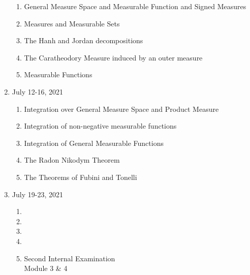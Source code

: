 \begin{enumerate}[label=Week \arabic*]
\begin{enumerate}[label=Day \arabic*]
		\item 
			General Measure Space and Measurable Function and Signed Measures
		\item 
			Measures and Measurable Sets
		\item 
			The Hanh and Jordan decompositions
		\item 
			The Caratheodory Measure induced by an outer measure
		\item 
			Measurable Functions
	\end{enumerate}
	\item July 12-16, 2021 
	\begin{enumerate}[label=Day \arabic*]
		\item 
			Integration over General Measure Space and Product Measure
		\item  
			Integration of non-negative measurable functions
		\item 
			Integration of General Measurable Functions
		\item 
			The Radon Nikodym Theorem
		\item 
			The Theorems of Fubini and Tonelli
	\end{enumerate}
	\item July 19-23, 2021 
	\begin{enumerate}[label=Day \arabic*]
		\item 
		\item 
		\item 
		\item 
		\item Second Internal Examination \\
			Module 3 \& 4
	\end{enumerate}
\end{enumerate}
